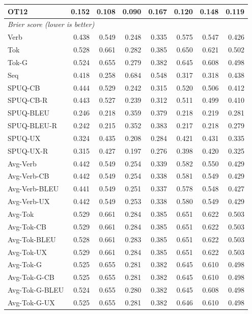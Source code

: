{\begin{longtable}{@{}lrrrrrrr@{}}
OT12 & 0.152 & 0.108 & 0.090 & 0.167 & 0.120 & 0.148 & 0.119 \\
\midrule
\multicolumn{8}{l}{\textit{Brier score (lower is better)}} \\
\midrule
Verb & 0.438 & 0.549 & 0.248 & 0.335 & 0.575 & 0.547 & 0.426 \\
\addlinespace
Tok & 0.528 & 0.661 & 0.282 & 0.385 & 0.650 & 0.621 & 0.502 \\
Tok-G & 0.524 & 0.655 & 0.279 & 0.382 & 0.645 & 0.608 & 0.498 \\
\addlinespace
Seq & 0.418 & 0.258 & 0.684 & 0.548 & 0.317 & 0.318 & 0.438 \\
\addlinespace
SPUQ-CB & 0.444 & 0.529 & 0.242 & 0.315 & 0.520 & 0.506 & 0.412 \\
SPUQ-CB-R & 0.443 & 0.527 & 0.239 & 0.312 & 0.511 & 0.499 & 0.410 \\
SPUQ-BLEU & 0.246 & 0.218 & 0.359 & 0.379 & 0.218 & 0.219 & 0.281 \\
SPUQ-BLEU-R & 0.242 & 0.215 & 0.352 & 0.383 & 0.217 & 0.218 & 0.279 \\
SPUQ-UX & 0.324 & 0.435 & 0.208 & 0.284 & 0.421 & 0.431 & 0.335 \\
SPUQ-UX-R & 0.315 & 0.427 & 0.197 & 0.276 & 0.398 & 0.420 & 0.325 \\
\addlinespace
Avg-Verb & 0.442 & 0.549 & 0.254 & 0.339 & 0.582 & 0.550 & 0.429 \\
Avg-Verb-CB & 0.442 & 0.549 & 0.254 & 0.338 & 0.581 & 0.549 & 0.429 \\
Avg-Verb-BLEU & 0.441 & 0.549 & 0.251 & 0.337 & 0.578 & 0.548 & 0.427 \\
Avg-Verb-UX & 0.442 & 0.549 & 0.253 & 0.338 & 0.580 & 0.549 & 0.429 \\
\addlinespace
Avg-Tok & 0.529 & 0.661 & 0.284 & 0.385 & 0.651 & 0.622 & 0.503 \\
Avg-Tok-CB & 0.529 & 0.661 & 0.284 & 0.385 & 0.651 & 0.622 & 0.503 \\
Avg-Tok-BLEU & 0.528 & 0.661 & 0.283 & 0.385 & 0.651 & 0.622 & 0.503 \\
Avg-Tok-UX & 0.529 & 0.661 & 0.284 & 0.385 & 0.651 & 0.622 & 0.503 \\
Avg-Tok-G & 0.525 & 0.655 & 0.281 & 0.382 & 0.645 & 0.610 & 0.498 \\
Avg-Tok-G-CB & 0.525 & 0.655 & 0.281 & 0.382 & 0.645 & 0.610 & 0.498 \\
Avg-Tok-G-BLEU & 0.524 & 0.655 & 0.280 & 0.382 & 0.645 & 0.608 & 0.498 \\
Avg-Tok-G-UX & 0.525 & 0.655 & 0.281 & 0.382 & 0.646 & 0.610 & 0.498 \\

\end{longtable}}
